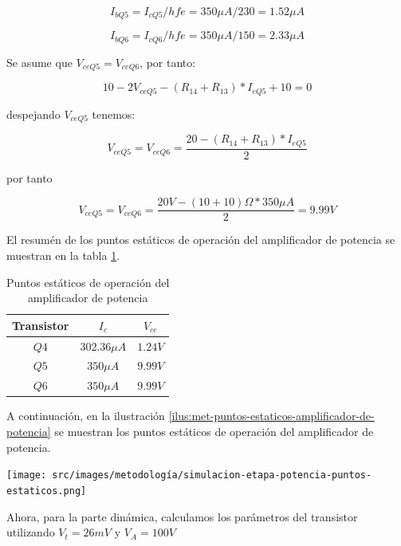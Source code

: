 $$I_{bQ5} = I_{cQ5} / hfe = 350\mu A / 230 = 1.52 \mu A $$

$$I_{bQ6} = I_{cQ6} / hfe = 350\mu A / 150 = 2.33 \mu A $$

Se asume que $V_{ceQ5} = V_{ceQ6} $, por tanto:

$$ 10 - 2 V_{ceQ5} - (R_{14} + R_{13}) * I_{eQ5} + 10 = 0$$

despejando $V_{ceQ5}$ tenemos:

\begin{equation}
    V_{ceQ5} = V_{ceQ6} = \frac{ 20 - (R_{14} + R_{13}) * I_{eQ5} }{2}
\end{equation}

por tanto 

$$ V_{ceQ5} = V_{ceQ6} = \frac{ 20 V - (10 + 10) \Omega * 350\mu A }{2} = 9.99 V$$

El resumén de los puntos estáticos de operación del amplificador de potencia se muestran en la tabla \ref{tab:amplificador-de-potencia-puntos-estaticos}.

\begin{table}[ht]
    \centering
    \begin{tabular}{|c|c|c|}
        \hline
        Transistor & \textbf{$I_c$} & \textbf{$V_{ce}$} \\
        \hline
        $Q4$ & $302.36 \mu A$ & $1.24 V$ \\
        $Q5$ & $350\mu A$ & $9.99 V$ \\
        $Q6$ & $350\mu A$ & $9.99 V$ \\
        \hline
    \end{tabular}
    \caption{Puntos estáticos de operación del amplificador de potencia}
    \label{tab:amplificador-de-potencia-puntos-estaticos}
\end{table}

A continuación, en la ilustración \ref{ilus:met-puntos-estaticos-amplificador-de-potencia} se muestran los puntos estáticos de operación del amplificador de potencia.

\begin{ilustracion}[ht]
    \centering
    \texttt{[image: src/images/metodología/simulacion-etapa-potencia-puntos-estaticos.png]}
    \caption{Puntos estáticos de operación del amplificador de potencia}
    \label{ilus:met-puntos-estaticos-amplificador-de-potencia}
\end{ilustracion}

Ahora, para la parte dinámica, calculamos los parámetros del transistor utilizando $V_t = 26 mV$ y $V_A = 100 V$

